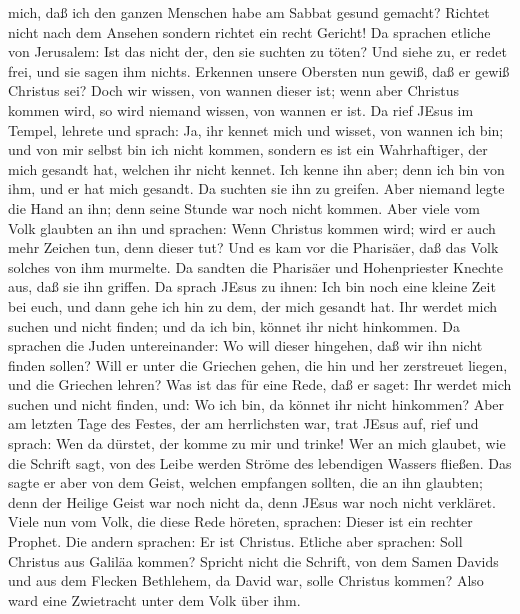 mich, daß ich den ganzen Menschen habe am Sabbat gesund gemacht?
 Richtet nicht nach dem Ansehen sondern richtet ein recht
Gericht!  Da sprachen etliche von Jerusalem: Ist das nicht
der, den sie suchten zu töten?  Und siehe zu, er redet
frei, und sie sagen ihm nichts. Erkennen unsere Obersten nun gewiß, daß
er gewiß Christus sei?  Doch wir wissen, von wannen dieser
ist; wenn aber Christus kommen wird, so wird niemand wissen, von wannen
er ist.  Da rief JEsus im Tempel, lehrete und sprach: Ja,
ihr kennet mich und wisset, von wannen ich bin; und von mir selbst bin
ich nicht kommen, sondern es ist ein Wahrhaftiger, der mich gesandt hat,
welchen ihr nicht kennet.  Ich kenne ihn aber; denn ich bin
von ihm, und er hat mich gesandt.  Da suchten sie ihn zu
greifen. Aber niemand legte die Hand an ihn; denn seine Stunde war noch
nicht kommen.  Aber viele vom Volk glaubten an ihn und
sprachen: Wenn Christus kommen wird; wird er auch mehr Zeichen tun, denn
dieser tut?  Und es kam vor die Pharisäer, daß das Volk
solches von ihm murmelte. Da sandten die Pharisäer und Hohenpriester
Knechte aus, daß sie ihn griffen.  Da sprach JEsus zu
ihnen: Ich bin noch eine kleine Zeit bei euch, und dann gehe ich hin zu
dem, der mich gesandt hat.  Ihr werdet mich suchen und
nicht finden; und da ich bin, könnet ihr nicht hinkommen. 
Da sprachen die Juden untereinander: Wo will dieser hingehen, daß wir
ihn nicht finden sollen? Will er unter die Griechen gehen, die hin und
her zerstreuet liegen, und die Griechen lehren?  Was ist
das für eine Rede, daß er saget: Ihr werdet mich suchen und nicht
finden, und: Wo ich bin, da könnet ihr nicht hinkommen? 
Aber am letzten Tage des Festes, der am herrlichsten war, trat JEsus
auf, rief und sprach: Wen da dürstet, der komme zu mir und trinke!
 Wer an mich glaubet, wie die Schrift sagt, von des Leibe
werden Ströme des lebendigen Wassers fließen.  Das sagte er
aber von dem Geist, welchen empfangen sollten, die an ihn glaubten; denn
der Heilige Geist war noch nicht da, denn JEsus war noch nicht
verkläret.  Viele nun vom Volk, die diese Rede höreten,
sprachen: Dieser ist ein rechter Prophet.  Die andern
sprachen: Er ist Christus. Etliche aber sprachen: Soll Christus aus
Galiläa kommen?  Spricht nicht die Schrift, von dem Samen
Davids und aus dem Flecken Bethlehem, da David war, solle Christus
kommen?  Also ward eine Zwietracht unter dem Volk über ihm.
